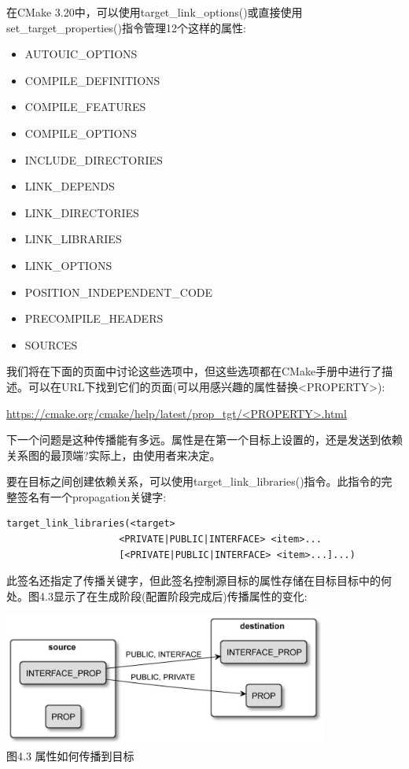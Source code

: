 在CMake 3.20中，可以使用target\_link\_options()或直接使用set\_target\_properties()指令管理12个这样的属性:

\begin{itemize}
\item 
AUTOUIC\_OPTIONS

\item 
COMPILE\_DEFINITIONS

\item 
COMPILE\_FEATURES

\item 
COMPILE\_OPTIONS

\item 
INCLUDE\_DIRECTORIES

\item 
LINK\_DEPENDS

\item 
LINK\_DIRECTORIES

\item 
LINK\_LIBRARIES

\item 
LINK\_OPTIONS

\item 
POSITION\_INDEPENDENT\_CODE

\item 
PRECOMPILE\_HEADERS

\item 
SOURCES
\end{itemize}

我们将在下面的页面中讨论这些选项中，但这些选项都在CMake手册中进行了描述。可以在URL下找到它们的页面(可以用感兴趣的属性替换<PROPERTY>):

\url{https://cmake.org/cmake/help/latest/prop_tgt/<PROPERTY>.html}

下一个问题是这种传播能有多远。属性是在第一个目标上设置的，还是发送到依赖关系图的最顶端?实际上，由使用者来决定。

要在目标之间创建依赖关系，可以使用target\_link\_libraries()指令。此指令的完整签名有一个propagation关键字:

\begin{lstlisting}[style=styleCMake]
target_link_libraries(<target>
					<PRIVATE|PUBLIC|INTERFACE> <item>...
					[<PRIVATE|PUBLIC|INTERFACE> <item>...]...)
\end{lstlisting}

此签名还指定了传播关键字，但此签名控制源目标的属性存储在目标目标中的何处。图4.3显示了在生成阶段(配置阶段完成后)传播属性的变化:

\begin{center}
\includegraphics[width=0.8\textwidth]{content/2/chapter4/images/3.jpg}\\
图4.3 属性如何传播到目标
\end{center}

